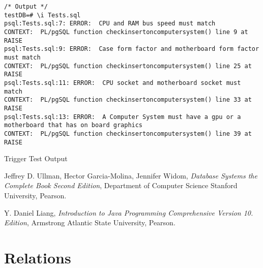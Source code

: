 \documentclass[12pt,a4paper]{article}
\begin{document}
\begin{listing}[!htbp]
\begin{verbatim}
/* Output */
testDB=# \i Tests.sql 
psql:Tests.sql:7: ERROR:  CPU and RAM bus speed must match
CONTEXT:  PL/pgSQL function checkinsertoncomputersystem() line 9 at RAISE
psql:Tests.sql:9: ERROR:  Case form factor and motherboard form factor must match
CONTEXT:  PL/pgSQL function checkinsertoncomputersystem() line 25 at RAISE
psql:Tests.sql:11: ERROR:  CPU socket and motherboard socket must match 
CONTEXT:  PL/pgSQL function checkinsertoncomputersystem() line 33 at RAISE
psql:Tests.sql:13: ERROR:  A Computer System must have a gpu or a motherboard that has on board graphics
CONTEXT:  PL/pgSQL function checkinsertoncomputersystem() line 39 at RAISE

\end{verbatim}
\caption{Trigger Test Output}
\label{output}
\end{listing}

\begin{thebibliography}{9}

    Jeffrey D. Ullman, Hector Garcia-Molina, Jennifer Widom,
    \emph{Database Systems the Complete Book Second Edition},
    Department of Computer Science Stanford University,
    Pearson.

    Y. Daniel Liang,
    \emph{Introduction to Java Programming Comprehensive Version 10. Edition},
    Armstrong Atlantic State University,
    Pearson.

\end{thebibliography}
\listoffigures
\listoflistings

\appendix

\section{Relations}
\end{document}
